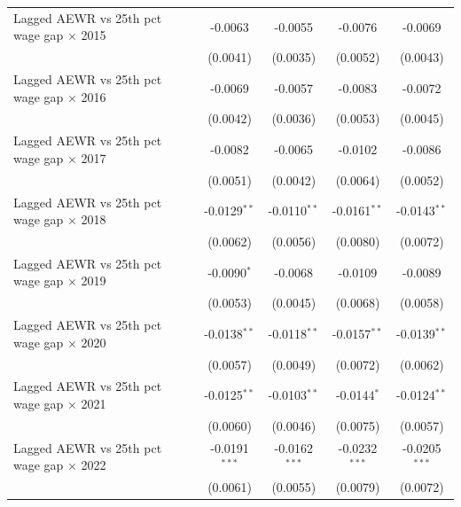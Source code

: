 \begin{tabular}{lcccc}
   Lagged AEWR vs 25th pct wage gap $\times$ 2015  & -0.0063         & -0.0055         & -0.0076                & -0.0069\\   
                                                   & (0.0041)        & (0.0035)        & (0.0052)               & (0.0043)\\   
   Lagged AEWR vs 25th pct wage gap $\times$ 2016  & -0.0069         & -0.0057         & -0.0083                & -0.0072\\   
                                                   & (0.0042)        & (0.0036)        & (0.0053)               & (0.0045)\\   
   Lagged AEWR vs 25th pct wage gap $\times$ 2017  & -0.0082         & -0.0065         & -0.0102                & -0.0086\\   
                                                   & (0.0051)        & (0.0042)        & (0.0064)               & (0.0052)\\   
   Lagged AEWR vs 25th pct wage gap $\times$ 2018  & -0.0129$^{**}$  & -0.0110$^{**}$  & -0.0161$^{**}$         & -0.0143$^{**}$\\   
                                                   & (0.0062)        & (0.0056)        & (0.0080)               & (0.0072)\\   
   Lagged AEWR vs 25th pct wage gap $\times$ 2019  & -0.0090$^{*}$   & -0.0068         & -0.0109                & -0.0089\\   
                                                   & (0.0053)        & (0.0045)        & (0.0068)               & (0.0058)\\   
   Lagged AEWR vs 25th pct wage gap $\times$ 2020  & -0.0138$^{**}$  & -0.0118$^{**}$  & -0.0157$^{**}$         & -0.0139$^{**}$\\   
                                                   & (0.0057)        & (0.0049)        & (0.0072)               & (0.0062)\\   
   Lagged AEWR vs 25th pct wage gap $\times$ 2021  & -0.0125$^{**}$  & -0.0103$^{**}$  & -0.0144$^{*}$          & -0.0124$^{**}$\\   
                                                   & (0.0060)        & (0.0046)        & (0.0075)               & (0.0057)\\   
   Lagged AEWR vs 25th pct wage gap $\times$ 2022  & -0.0191$^{***}$ & -0.0162$^{***}$ & -0.0232$^{***}$        & -0.0205$^{***}$\\   
                                                   & (0.0061)        & (0.0055)        & (0.0079)               & (0.0072)\\   

\end{tabular}

